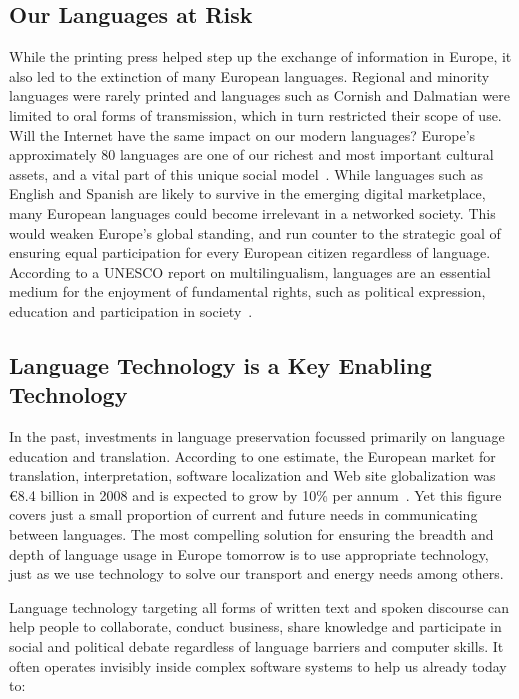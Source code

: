 \begin{multicols}{2}
\subsection{Our Languages at Risk}

While the printing press helped step up the exchange of information in Europe, it also led to the extinction of many European languages. Regional and minority languages were rarely printed and languages such as Cornish and Dalmatian were limited to oral forms of transmission, which in turn restricted their scope of use. Will the Internet have the same impact on our modern languages?
Europe's approximately 80 languages are one of our richest and most important cultural assets, and a vital part of this unique social model~\cite{EC2}. While languages such as English and Spanish are likely to survive in the emerging digital marketplace, many European languages could become irrelevant in a networked society. This would weaken Europe's global standing, and run counter to the strategic goal of ensuring equal participation for every European citizen regardless of language. According to a UNESCO report on multilingualism, languages are an essential medium for the enjoyment of fundamental rights, such as political expression, education and participation in society~\cite{UNESCO2007}.

\subsection{Language Technology is a Key Enabling Technology}

In the past, investments in language preservation focussed primarily on language education and translation. According to one estimate, the European market for translation, interpretation, software localization and Web site globalization was €8.4 billion in 2008 and is expected to grow by 10\% per annum~\cite{dgt08}. Yet this figure covers just a small proportion of current and future needs in communicating between languages. The most compelling solution for ensuring the breadth and depth of language usage in Europe tomorrow is to use appropriate technology, just as we use technology to solve our transport and energy needs among others.

Language technology targeting all forms of written text and spoken discourse can help people to collaborate, conduct business, share knowledge and participate in social and political debate regardless of language barriers and computer skills. It often operates invisibly inside complex software systems to help us already today to:


\end{multicols}
